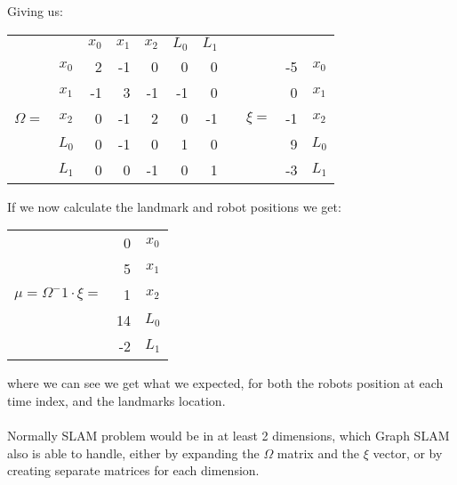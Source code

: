 \newpage 
Giving us:
\begin{table}[!h]
    \centering
    \begin{tabular}{cc|rrrrr c crc}
        &       & $x_0$ & $x_1$ & $x_2$ & $L_0$ & $L_1$ & 
        
        \qquad &        &                        & \\
        
        \cline{2-7}
        & $x_0$ &   2   &  -1   &  0    &  0    &   0   &  
        
        &        &\multicolumn{1}{r|}{-5} & $x_0$\\
        
        & $x_1$ &  -1   &   3   &  -1    &  -1    &   0   &  
        
        &        & \multicolumn{1}{r|}{0} & $x_1$\\
        
$\Omega=$&$x_2$ &   0   &   -1   &  2    &  0    &  -1   &  
        
        & $\xi=$ &\multicolumn{1}{r|}{-1} & $x_2$\\
        
        & $L_0$ &   0   &   -1   &  0    &  1   &   0   &  
        
        &        & \multicolumn{1}{r|}{9} & $L_0$\\
        
        & $L_1$ &   0   &   0   &  -1    &  0    &   1  &  
        
        &        & \multicolumn{1}{r|}{-3} & $L_1$\\
    \end{tabular}                                               
\end{table}

\noindent If we now calculate the landmark and robot positions we get:
\begin{table}[!h]
    \centering
    \begin{tabular}{cr|c}
                                      &  0 & $x_0$ \\
                                      &  5 & $x_1$ \\
       $\mu = \Omega^-1 \cdot \xi = $ &  1 & $x_2$ \\
                                      & 14 & $L_0$ \\
                                      & -2 & $L_1$ \\
    \end{tabular}                                               
\end{table}

\noindent where we can see we get what we expected, for both the robots position at each time index, and the landmarks location.\\\\

\noindent Normally SLAM problem would be in at least 2 dimensions, which Graph SLAM also is able to handle, either by expanding the $\Omega$ matrix and the $\xi$ vector, or by creating separate matrices for each dimension.